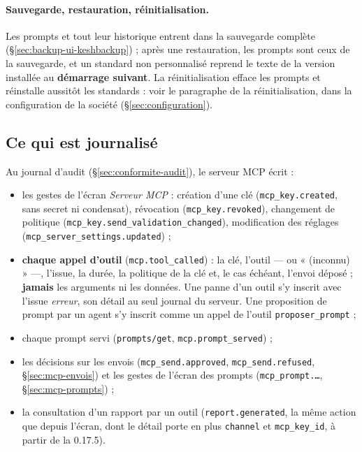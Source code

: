 \documentclass[a4paper,11pt,oneside]{article}
\begin{document}
\paragraph{Sauvegarde, restauration, réinitialisation.} Les prompts et tout leur historique entrent dans la sauvegarde complète (\S\ref{sec:backup-ui-keshbackup}) ; après une restauration, les prompts sont ceux de la sauvegarde, et un standard non personnalisé reprend le texte de la version installée au \textbf{démarrage suivant}. La réinitialisation efface les prompts et réinstalle aussitôt les standards : voir le paragraphe de la réinitialisation, dans la configuration de la société (\S\ref{sec:configuration}).

\subsection{Ce qui est journalisé}\label{sec:mcp-journal}

Au journal d'audit (\S\ref{sec:conformite-audit}), le serveur MCP écrit :
\begin{itemize}
    \item les gestes de l'écran \emph{Serveur MCP} : création d'une clé (\texttt{mcp\_key.created}, sans secret ni condensat), révocation (\texttt{mcp\_key.revoked}), changement de politique (\texttt{mcp\_key.send\_validation\_changed}), modification des réglages (\texttt{mcp\_server\_settings.updated}) ;
    \item \textbf{chaque appel d'outil} (\texttt{mcp.tool\_called}) : la clé, l'outil --- ou « (inconnu) » ---, l'issue, la durée, la politique de la clé et, le cas échéant, l'envoi déposé ; \textbf{jamais} les arguments ni les données. Une panne d'un outil s'y inscrit avec l'issue \emph{erreur}, son détail au seul journal du serveur. Une proposition de prompt par un agent s'y inscrit comme un appel de l'outil \texttt{proposer\_prompt} ;
    \item chaque prompt servi (\texttt{prompts/get}, \texttt{mcp.prompt\_served}) ;
    \item les décisions sur les envois (\texttt{mcp\_send.approved}, \texttt{mcp\_send.refused}, \S\ref{sec:mcp-envois}) et les gestes de l'écran des prompts (\texttt{mcp\_prompt.\ldots}, \S\ref{sec:mcp-prompts}) ;
    \item la consultation d'un rapport par un outil (\texttt{report.generated}, la même action que depuis l'écran, dont le détail porte en plus \texttt{channel} et \texttt{mcp\_key\_id}, à partir de la 0.17.5).
\end{itemize}
\end{document}
